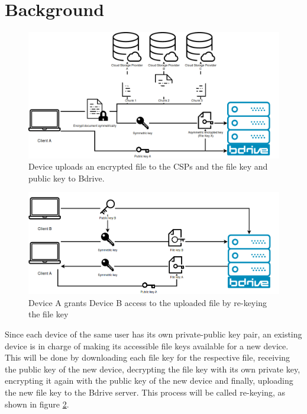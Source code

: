\section{Background}
\begin{figure}[!ht]
\centering
    \includegraphics[width=1\linewidth]{img/bdrive1.png}\par 
    \caption{Device uploads an encrypted file to the \ac{CSP}s and the file key and public key to Bdrive.}
    \label{fig:filekey}
\end{figure}
\begin{figure}[!ht]
\centering
    \includegraphics[width=1\linewidth]{img/bdrive2.png}\par
    \caption{Device A grants Device B access to the uploaded file by re-keying the file key}
    \label{fig:rekey}
\end{figure}
Since each device of the same user has its own private-public key pair, an existing device is in charge of making its accessible file keys available for a new device. This will be done by downloading each file key for the respective file, receiving the public key of the new device, decrypting the file key with its own private key, encrypting it again with the public key of the new device and finally, uploading the new file key to the Bdrive server. This process will be called re-keying, as shown in figure \ref{fig:rekey}. 

